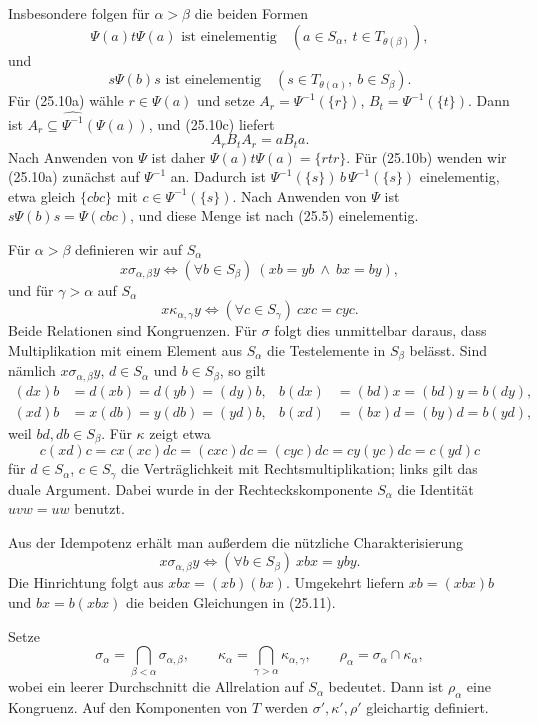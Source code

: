 \documentclass[main.tex]{subfiles}
\begin{document}
Insbesondere folgen für \(\alpha>\beta\) die beiden Formen
\[
 \Psi(a)t\Psi(a)\text{ ist einelementig}
 \quad(a\in S_\alpha,\ t\in T_{\theta(\beta)}),           \tag{25.10a}
\]
und
\[
 s\Psi(b)s\text{ ist einelementig}
 \quad(s\in T_{\theta(\alpha)},\ b\in S_\beta).          \tag{25.10b}
\]
Für (25.10a) wähle \(r\in\Psi(a)\) und setze
\(A_r=\Psi^{-1}(\{r\})\),
\(B_t=\Psi^{-1}(\{t\})\).  Dann ist
\(A_r\subseteq\widehat{\Psi^{-1}}(\Psi(a))\), und (25.10c) liefert
\[
 A_rB_tA_r=aB_ta.
\]
Nach Anwenden von \(\Psi\) ist daher
\(\Psi(a)t\Psi(a)=\{rtr\}\).  Für (25.10b) wenden wir (25.10a)
zunächst auf \(\Psi^{-1}\) an.  Dadurch ist
\(\Psi^{-1}(\{s\})\,b\,\Psi^{-1}(\{s\})\) einelementig, etwa gleich
\(\{cbc\}\) mit \(c\in\Psi^{-1}(\{s\})\).  Nach Anwenden von \(\Psi\)
ist \(s\Psi(b)s=\Psi(cbc)\), und diese Menge ist nach (25.5)
einelementig.

Für \(\alpha>\beta\) definieren wir auf \(S_\alpha\)
\[
 x\mathrel{\sigma_{\alpha,\beta}}y
 \iff
 (\forall b\in S_\beta)\ (xb=yb\ \land\ bx=by),          \tag{25.11}
\]
und für \(\gamma>\alpha\) auf \(S_\alpha\)
\[
 x\mathrel{\kappa_{\alpha,\gamma}}y
 \iff
 (\forall c\in S_\gamma)\ cxc=cyc.                      \tag{25.12}
\]
Beide Relationen sind Kongruenzen.  Für \(\sigma\) folgt dies unmittelbar
daraus, dass Multiplikation mit einem Element aus \(S_\alpha\) die
Testelemente in \(S_\beta\) belässt.  Sind nämlich
\(x\mathrel{\sigma_{\alpha,\beta}}y\),
\(d\in S_\alpha\) und \(b\in S_\beta\), so gilt
\[
\begin{aligned}
 (dx)b&=d(xb)=d(yb)=(dy)b,&
 b(dx)&=(bd)x=(bd)y=b(dy),\\
 (xd)b&=x(db)=y(db)=(yd)b,&
 b(xd)&=(bx)d=(by)d=b(yd),
\end{aligned}
\]
weil \(bd,db\in S_\beta\).  Für \(\kappa\) zeigt etwa
\[
 c(xd)c=cx(xc)dc=(cxc)dc=(cyc)dc=cy(yc)dc=c(yd)c
\]
für \(d\in S_\alpha\), \(c\in S_\gamma\) die Verträglichkeit mit
Rechtsmultiplikation; links gilt das duale Argument.  Dabei wurde in der
Rechteckskomponente \(S_\alpha\) die Identität \(uvw=uw\) benutzt.

Aus der Idempotenz erhält man außerdem die nützliche Charakterisierung
\[
 x\mathrel{\sigma_{\alpha,\beta}}y
 \iff
 (\forall b\in S_\beta)\ xbx=yby.                         \tag{25.13}
\]
Die Hinrichtung folgt aus
\(xbx=(xb)(bx)\).  Umgekehrt liefern
\(xb=(xbx)b\) und \(bx=b(xbx)\) die beiden Gleichungen in
(25.11).

Setze
\[
 \sigma_\alpha=\bigcap_{\beta<\alpha}\sigma_{\alpha,\beta},
 \qquad
 \kappa_\alpha=\bigcap_{\gamma>\alpha}\kappa_{\alpha,\gamma},
 \qquad
 \rho_\alpha=\sigma_\alpha\cap\kappa_\alpha,             \tag{25.14}
\]
wobei ein leerer Durchschnitt die Allrelation auf \(S_\alpha\) bedeutet.
Dann ist \(\rho_\alpha\) eine Kongruenz.  Auf den Komponenten von \(T\)
werden \(\sigma',\kappa',\rho'\) gleichartig definiert.
\end{document}
